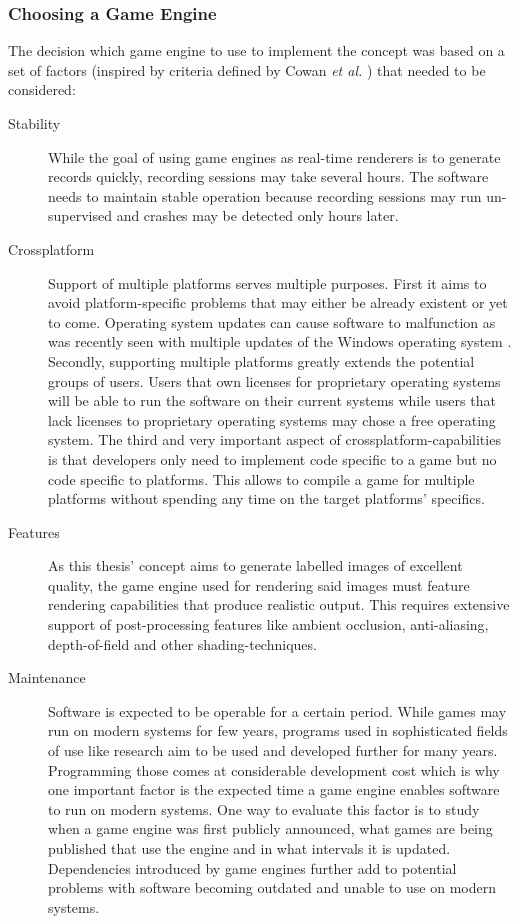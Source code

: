 \subsubsection{Choosing a Game Engine}
The decision which game engine to use to implement the concept was based on a set of factors (inspired by criteria defined by Cowan \textit{et al.} \cite{6901570}) that needed to be considered:
\begin{description}
\item [Stability] While the goal of using game engines as real-time renderers is to generate records quickly, recording sessions may take several hours. The software needs to maintain stable operation because recording sessions may run un-supervised and crashes may be detected only hours later.
\item [Crossplatform] Support of multiple platforms serves multiple purposes. First it aims to avoid platform-specific problems that may either be already existent or yet to come. Operating system updates can cause software to malfunction as was recently seen with multiple updates of the Windows operating system \cite{heiseWindowsUpdate}. Secondly, supporting multiple platforms greatly extends the potential groups of users. Users that own licenses for proprietary operating systems will be able to run the software on their current systems while users that lack licenses to proprietary operating systems may chose a free operating system. The third and very important aspect of crossplatform-capabilities is that developers only need to implement code specific to a game but no code specific to platforms. This allows to compile a game for multiple platforms without spending any time on the target platforms' specifics.
\item [Features] As this thesis' concept aims to generate labelled images of excellent quality, the game engine used for rendering said images must feature rendering capabilities that produce realistic output. This requires extensive support of post-processing features like ambient occlusion, anti-aliasing, depth-of-field and other shading-techniques.
\item [Maintenance] Software is expected to be operable for a certain period. While games may run on modern systems for few years, programs used in sophisticated fields of use like research aim to be used and developed further for many years. Programming those comes at considerable development cost which is why one important factor is the expected time a game engine enables software to run on modern systems. One way to evaluate this factor is to study when a game engine was first publicly announced, what games are being published that use the engine and in what intervals it is updated. Dependencies introduced by game engines further add to potential problems with software becoming outdated and unable to use on modern systems. 

\end{description}
